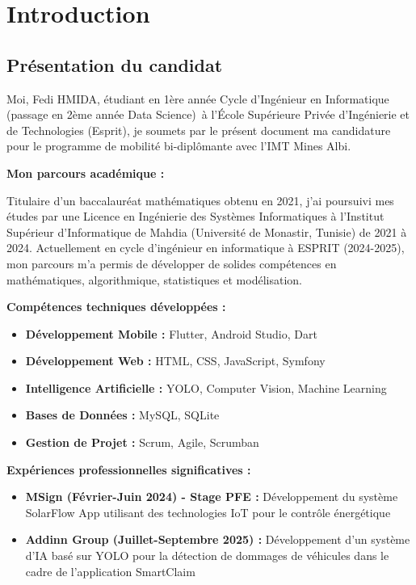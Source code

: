 \documentclass[12pt,a4paper]{report}
\newcommand{\candidatename}{Fedi HMIDA}
\newcommand{\currentprogram}{1ère année Cycle d'Ingénieur en Informatique (passage en 2ème année Data Science)}
\begin{document}


\cleardoublepage
\tableofcontents
\cleardoublepage

\chapter{Introduction}

\section{Présentation du candidat}

Moi, \candidatename, étudiant en \currentprogram\ à l'École Supérieure Privée d'Ingénierie et de Technologies (Esprit), je soumets par le présent document ma candidature pour le programme de mobilité bi-diplômante avec l'IMT Mines Albi.

\textbf{Mon parcours académique :}

Titulaire d'un baccalauréat mathématiques obtenu en 2021, j'ai poursuivi mes études par une Licence en Ingénierie des Systèmes Informatiques à l'Institut Supérieur d'Informatique de Mahdia (Université de Monastir, Tunisie) de 2021 à 2024. Actuellement en cycle d'ingénieur en informatique à ESPRIT (2024-2025), mon parcours m'a permis de développer de solides compétences en mathématiques, algorithmique, statistiques et modélisation.

\textbf{Compétences techniques développées :}
\begin{itemize}
    \item \textbf{Développement Mobile :} Flutter, Android Studio, Dart
    \item \textbf{Développement Web :} HTML, CSS, JavaScript, Symfony
    \item \textbf{Intelligence Artificielle :} YOLO, Computer Vision, Machine Learning
    \item \textbf{Bases de Données :} MySQL, SQLite
    \item \textbf{Gestion de Projet :} Scrum, Agile, Scrumban
\end{itemize}

\textbf{Expériences professionnelles significatives :}
\begin{itemize}
    \item \textbf{MSign (Février-Juin 2024) - Stage PFE :} Développement du système SolarFlow App utilisant des technologies IoT pour le contrôle énergétique
    \item \textbf{Addinn Group (Juillet-Septembre 2025) :} Développement d'un système d'IA basé sur YOLO pour la détection de dommages de véhicules dans le cadre de l'application SmartClaim
\end{itemize}
\end{document}
